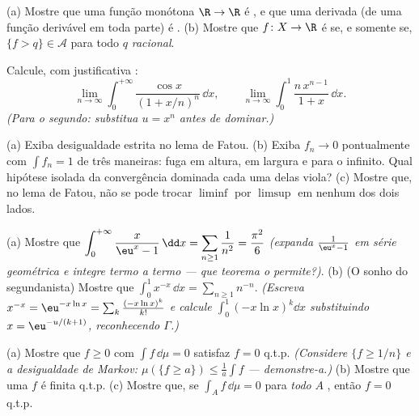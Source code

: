 \begin{exercise}[$\star$]\label{exo:b3:lebesgue:1}
(a) Mostre que uma função monótona $\R \to \R$ é , e que uma
derivada (de uma função derivável em toda parte) é .
(b) Mostre que $f \colon X \to \R$ é  se, e somente se, $\{f > q\}
\in \mathcal A$ para todo
$q$ \emph{racional}.
\end{exercise}

\begin{exercise}[$\star$]\label{exo:b3:lebesgue:2}
Calcule, com justificativa :
\[
\lim_{n\to\infty}\int_0^{+\infty}
\frac{\cos x}{(1 + x/n)^{n}}\,\dd x,
\qquad
\lim_{n\to\infty}\int_0^1 \frac{n\,x^{n-1}}{1 + x}\,\dd x .
\]
\emph{(Para o segundo: substitua $u = x^n$ antes de dominar.)}
\end{exercise}

\begin{exercise}[$\star\star$]\label{exo:b3:lebesgue:3}
(a) Exiba desigualdade estrita no lema de Fatou.
(b) Exiba $f_n \to 0$ pontualmente com $\int f_n = 1$ de três maneiras: fuga em
altura, em largura e para o infinito. Qual hipótese isolada da
convergência dominada cada uma delas viola?
(c) Mostre que, no lema de Fatou, não se pode trocar $\liminf$ por $\limsup$ em
nenhum dos dois lados.
\end{exercise}

\begin{exercise}[$\star\star$]\label{exo:b3:lebesgue:4}
(a) Mostre que $\displaystyle\int_0^{+\infty}\frac{x}{\eu^x -
1}\,\dd x = \sum_{n\geq1}\frac1{n^2} = \frac{\pi^2}6$ \emph{(expanda $\frac1{\eu^x - 1}$ em série geométrica e integre
termo a termo --- que teorema o permite?)}.
(b) (O sonho do segundanista) Mostre que $\displaystyle\int_0^1 x^{-x}\,\dd x = \sum_{n\geq1}n^{-n}$. \emph{(Escreva $x^{-x} = \eu^{-x\ln x} = \sum_k\frac{(-x\ln
x)^k}{k!}$ e
calcule $\int_0^1(-x\ln x)^k\dd x$ substituindo $x = \eu^{-u/(k+1)}$, reconhecendo $\Gamma$.)}
\end{exercise}

\begin{exercise}[$\star\star$]\label{exo:b3:lebesgue:5}
(a) Mostre que $f \geq 0$  com $\int f\,\dd\mu = 0$ satisfaz $f = 0$ q.t.p.
\emph{(Considere $\{f \geq 1/n\}$ e a desigualdade de Markov: $\mu(\{f \geq a\}) \leq \frac1a\int f$ ---
demonstre-a.)}
(b) Mostre que uma $f$  é finita q.t.p.
(c) Mostre que, se $\int_A f\,\dd\mu = 0$ para \emph{todo} $A$ , então
$f = 0$ q.t.p.
\end{exercise}

